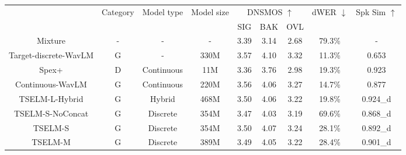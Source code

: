 \documentclass[conference]{IEEEtran}
\begin{document}
\begin{table}
    \setlength{\tabcolsep}{12pt} %
    \renewcommand{\arraystretch}{1.3}
    \begin{center}
        \begin{tabular}{ccccccccc}
            \Xhline{2\arrayrulewidth} %
            \multirow{2}{*}{System} & \multirow{2}{*}{Category} & \multirow{2}{*}{Model type} & \multirow{2}{*}{Model size} & \multicolumn{3}{c}{ DNSMOS $\uparrow$} & \multirow{2}{*}{dWER $\downarrow$} & \multirow{2}{*}{Spk Sim $\uparrow$} \\
            \cline{5-7}
              &                   &                             &                             & SIG     & BAK     & OVL    &                       &                          \\ 
            \hline
            Mixture                 & - & -                           & -                           & 3.39    & 3.14    & 2.68   & 79.3\%                & -                        \\
            Target-discrete-WavLM   & G & -                          & 330M                           & 3.57    & 4.10    & 3.32   & 11.3\%                & 0.653                    \\
            \hline
            Spex+                   &  D & Continuous                  & 11M                         & 3.36    & 3.76    & 2.98   & 19.3\%                & 0.923                    \\
            \hline
            Continuous-WavLM   & G    & Continuous                  & 220M                        & 3.56    & 4.06    & 3.27   & 14.7\%                & 0.877                    \\
            TSELM-L-Hybrid    & G       & Hybrid                      & 468M                        & 3.50    & 4.06    & 3.22   & 19.8\%                & 0.924\_d                 \\
            TSELM-S-NoConcat           & G       & Discrete                    & 354M                        & 3.47    & 4.03    & 3.19   & 69.6\%                & 0.868\_d                 \\
            \hline
            TSELM-S           & G       & Discrete                    & 354M                        & 3.50    & 4.07    & 3.24   & 28.1\%                & 0.892\_d                 \\
            TSELM-M          & G        & Discrete                    & 389M                        & 3.49    & 4.05    & 3.22   & 28.4\%                & 0.901\_d                 \\

\end{tabular}
\end{center}
\end{table}
\end{document}
